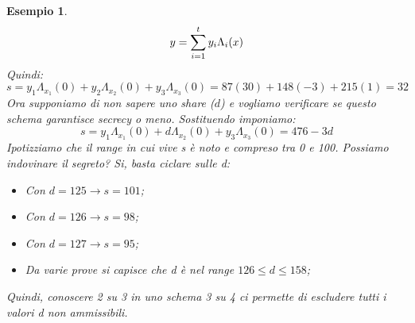 \documentclass{book}
\newtheorem{esempio}{\textcolor{Grey1}{Esempio}}
\begin{document}
\begin{esempio}
\begin{equation*}
		\centering
		y=\sum_{i=1}^{t}{y_{i}\Lambda_{i}(x)}
	\end{equation*}
	Quindi:
	\begin{equation*}
		s=y_{1}\Lambda_{x_{1}}(0)+y_{2}\Lambda_{x_{2}}(0)+y_{3}\Lambda_{x_{3}}(0)=87(30)+148(-3)+215(1)=32
	\end{equation*}
	Ora supponiamo di non sapere uno share \emph(\(d\)) e vogliamo verificare se questo schema garantisce secrecy o meno\@. Sostituendo imponiamo:
	\begin{equation*}
		s=y_{1}\Lambda_{x_{1}}(0)+d\Lambda_{x_{2}}(0)+y_{3}\Lambda_{x_{3}}(0)= 476-3d
	\end{equation*}
	Ipotizziamo che il range in cui vive s è noto e compreso tra 0 e 100\@. Possiamo indovinare il segreto? Si, basta ciclare sulle d:\begin{itemize}
		\item Con \(d=125\rightarrow s=101\);
		\item Con \(d=126\rightarrow s=98\);
		\item Con \(d=127\rightarrow s=95\);
		\item Da varie prove si capisce che d è nel range \(126\leq d\leq 158\);
	\end{itemize}
	Quindi, conoscere 2 su 3 in uno schema 3 su 4 ci permette di escludere tutti i valori d non ammissibili\@.
\end{esempio}
\end{document}
